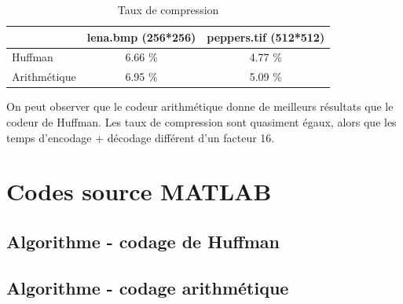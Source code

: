 \documentclass[a4paper, 12pt]{article}
\newcommand{\FSource}[1]{%

}
\begin{document}
\begin{table}[!h]
	\centering
		\begin{tabular}{l|c | c|}
			\cline{2-3}
			                                   & lena.bmp (256*256) & peppers.tif (512*512) \\
			\hline
			\multicolumn{1}{|l|}{Huffman}      & 6.66 \%            & 4.77 \%               \\
			\hline
			\multicolumn{1}{|l|}{Arithmétique} & 6.95 \%            & 5.09 \%               \\
			\hline
		\end{tabular}
	\caption{Taux de compression}
	\label{tab:TableTauxCompress}
\end{table}

On peut observer que le codeur arithmétique donne de meilleurs résultats que le codeur de Huffman. Les taux de compression sont quasiment égaux, alors que les temps d'encodage + décodage différent d'un facteur 16.

\clearpage
\appendix

\section{Codes source MATLAB}
\subsection{Algorithme - codage de Huffman}\label{algohuffman}

\FSource{../huffman.m}

\newpage
\subsection{Algorithme - codage arithmétique}\label{algoarithmetique}

\FSource{../arith.m}
\end{document}
